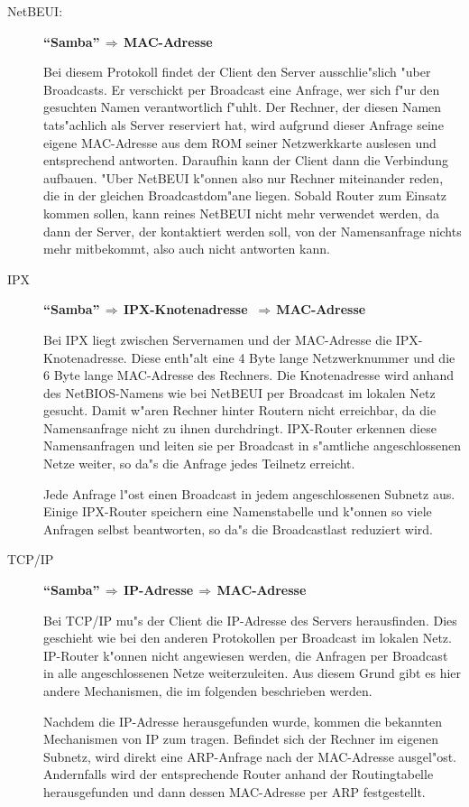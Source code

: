 \documentclass{scrartcl}
\begin{document}
\begin{description}

\item[NetBEUI:]

  \textbf{"`Samba"'$\,\Rightarrow\,$MAC-Adresse}
  
  Bei diesem Protokoll findet der Client den Server ausschlie"slich
  "uber Broadcasts. Er verschickt per Broadcast eine Anfrage, wer sich
  f"ur den gesuchten Namen verantwortlich f"uhlt. Der Rechner, der
  diesen Namen tats"achlich als Server reserviert hat, wird aufgrund
  dieser Anfrage seine eigene MAC-Adresse aus dem ROM seiner
  Netzwerkkarte auslesen und entsprechend antworten. Daraufhin kann
  der Client dann die Verbindung aufbauen. "Uber NetBEUI k"onnen also
  nur Rechner miteinander reden, die in der gleichen Broadcastdom"ane
  liegen. Sobald Router zum Einsatz kommen sollen, kann reines NetBEUI
  nicht mehr verwendet werden, da dann der Server, der kontaktiert
  werden soll, von der Namensanfrage nichts mehr mitbekommt, also auch
  nicht antworten kann.
  
\item[IPX]
  
  \textbf{"`Samba"'$\,\Rightarrow\,$IPX-Knotenadresse
    $\,\Rightarrow\,$MAC-Adresse}
  
  Bei IPX liegt zwischen Servernamen und der MAC-Adresse die
  IPX-Knotenadresse. Diese enth"alt eine 4 Byte lange Netzwerknummer
  und die 6 Byte lange MAC-Adresse des Rechners. Die Knotenadresse
  wird anhand des NetBIOS-Namens wie bei NetBEUI per Broadcast im
  lokalen Netz gesucht. Damit w"aren Rechner hinter Routern nicht
  erreichbar, da die Namensanfrage nicht zu ihnen durchdringt.
  IPX-Router erkennen diese Namensanfragen und leiten sie per
  Broadcast in s"amtliche angeschlossenen Netze weiter, so da"s die
  Anfrage jedes Teilnetz erreicht.
  
  Jede Anfrage l"ost einen Broadcast in jedem angeschlossenen Subnetz
  aus. Einige IPX-Router speichern eine Namenstabelle und k"onnen so
  viele Anfragen selbst beantworten, so da"s die Broadcastlast
  reduziert wird.

\item[TCP/IP]
  
  \textbf{"`Samba"'$\,\Rightarrow\,$IP-Adresse$\,\Rightarrow\,
    $MAC-Adresse}

  Bei TCP/IP mu"s der Client die IP-Adresse des Servers herausfinden.
  Dies geschieht wie bei den anderen Protokollen per Broadcast im
  lokalen Netz. IP-Router k"onnen nicht angewiesen werden, die
  Anfragen per Broadcast in alle angeschlossenen Netze weiterzuleiten.
  Aus diesem Grund gibt es hier andere Mechanismen, die im folgenden
  beschrieben werden.
  
  Nachdem die IP-Adresse herausgefunden wurde, kommen die bekannten
  Mechanismen von IP zum tragen. Befindet sich der Rechner im eigenen
  Subnetz, wird direkt eine ARP-Anfrage nach der MAC-Adresse
  ausgel"ost. Andernfalls wird der entsprechende Router anhand der
  Routingtabelle herausgefunden und dann dessen MAC-Adresse per ARP
  festgestellt.

\end{description}
\end{document}
